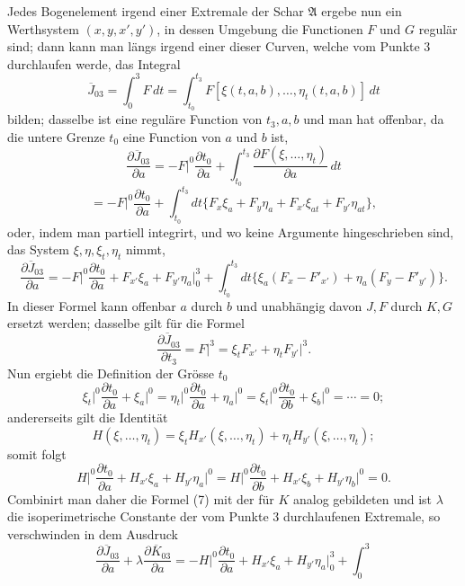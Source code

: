 \documentclass[11pt,a4paper,leqno]{article}
\begin{document}
Jedes Bogenelement irgend einer Extremale der Schar $\mathfrak{A}$ ergebe nun ein Werthsystem $(x,y,x',y')$, in dessen Umgebung die Functionen $F$ und $G$ regulär sind; dann kann man längs irgend einer dieser Curven, welche vom Punkte 3 durchlaufen werde, das Integral
\[
\overline{J}_{03}=\int_0^3F\,dt=
\int_{t_0}^{t_3}F[\xi(t,a,b),\ldots,\eta_t(t,a,b)]\,dt
\]
bilden; dasselbe ist eine reguläre Function von $t_3,a,b$ und man hat offenbar, da die untere Grenze $t_0$ eine Function von $a$ und $b$ ist,
\[
\frac{\partial\overline{J}_{03}}{\partial a}
=-F\bigg|^0\frac{\partial t_0}{\partial a}+
\int_{t_0}^{t_3}\frac{\partial F(\xi,\ldots,\eta_t)}{\partial a}\,dt
\]
\[
=-F\bigg|^0\frac{\partial t_0}{\partial a}+
\int_{t_0}^{t_3}dt\{F_x\xi_a+F_y\eta_a+F_{x'}\xi_{at}+F_{y'}\eta_{at}\},
\]
oder, indem man partiell integrirt, und wo keine Argumente hingeschrieben sind, das System $\xi,\eta,\xi_t,\eta_t$ nimmt,
\begin{equation}\tag{7}
\frac{\partial\overline{J}_{03}}{\partial a}
=-F\bigg|^0\frac{\partial t_0}{\partial a}+
F_{x'}\xi_a+F_{y'}\eta_a\bigg|_0^3+
\int_{t_0}^{t_3}dt\{\xi_a(F_x-F'_{x'})+\eta_a(F_y-F'_{y'})\}.
\end{equation}
In dieser Formel kann offenbar $a$ durch $b$ und unabhängig davon $J,F$ durch $K,G$ ersetzt werden; dasselbe gilt für die Formel
\begin{equation}\tag{8}
\frac{\partial\overline{J}_{03}}{\partial t_3}=F\bigg|^3=\xi_tF_{x'}+\eta_tF_{y'}\bigg|^3.
\end{equation}
Nun ergiebt die Definition der Grösse $t_0$
\[
\xi_t\bigg|^0\frac{\partial t_0}{\partial a}+\xi_a\bigg|^0
=\eta_t\bigg|^0\frac{\partial t_0}{\partial a}+\eta_a\bigg|^0
=\xi_t\bigg|^0\frac{\partial t_0}{\partial b}+\xi_b\bigg|^0=\cdots=0;
\]
andererseits gilt die Identität
\[
H(\xi,\ldots,\eta_t)=\xi_tH_{x'}(\xi,\ldots,\eta_t)+\eta_tH_{y'}(\xi,\ldots,\eta_t);
\]
somit folgt
\begin{equation}\tag{9}
H\bigg|^0\frac{\partial t_0}{\partial a}+H_{x'}\xi_a+H_{y'}\eta_a\bigg|^0
=H\bigg|^0\frac{\partial t_0}{\partial b}+H_{x'}\xi_b+H_{y'}\eta_b\bigg|^0=0.
\end{equation}
Combinirt man daher die Formel (7) mit der für $K$ analog gebildeten und ist $\lambda$ die isoperimetrische Constante der vom Punkte 3 durchlaufenen Extremale, so verschwinden in dem Ausdruck
\[
\frac{\partial\overline{J}_{03}}{\partial a}+\lambda\frac{\partial\overline{K}_{03}}{\partial a}
=-H\bigg|^0\frac{\partial t_0}{\partial a}+H_{x'}\xi_a+H_{y'}\eta_a\bigg|_0^3+\int_0^3
\]
\end{document}
